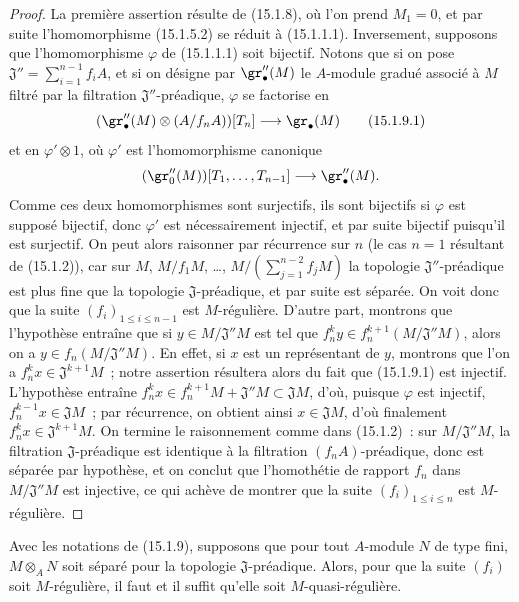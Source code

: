 \begin{proof}
La première assertion résulte de (15.1.8), où l'on prend $M_1=0$, et par suite
l'homomorphisme (15.1.5.2) se réduit à (15.1.1.1). Inversement, supposons que
l'homomorphisme $\varphi$ de (15.1.1.1) soit bijectif. Notons que si on pose
$\mathfrak{J}''=\sum_{i=1}^{n-1}f_iA$,
et si on désigne par $\gr''_\bullet(M)$ le $A$-module gradué associé à $M$
filtré par la filtration $\mathfrak{J}''$-préadique, $\varphi$ se factorise en
\[
  (\gr''_\bullet(M)\otimes(A/f_nA))[T_n]\longrightarrow\gr_\bullet(M)
  \tag{15.1.9.1}\label{0.15.1.9.1-fr}
\]
et en $\varphi'\otimes1$, où $\varphi'$ est l'homomorphisme canonique
\[
  (\gr''_0(M))[T_1,\ldots,T_{n-1}]
  \longrightarrow\gr''_\bullet(M).
\]
Comme ces deux homomorphismes sont surjectifs, ils sont bijectifs si
$\varphi$ est supposé bijectif, donc $\varphi'$ est nécessairement injectif,
et par suite bijectif puisqu'il est surjectif. On peut alors raisonner par
récurrence sur $n$ (le cas $n=1$ résultant de (15.1.2)), car sur
$M$, $M/f_1M$, \ldots, $M/(\sum_{j=1}^{n-2}f_jM)$
la topologie $\mathfrak{J}''$-préadique est plus fine que la topologie
$\mathfrak{J}$-préadique, et par suite est séparée. On voit donc que la suite
$(f_i)_{1\leq i\leq n-1}$ est $M$-régulière. D'autre part, montrons que
l'hypothèse entraîne que si $y\in M/\mathfrak{J}''M$ est tel que
$f_n^ky\in f_n^{k+1}(M/\mathfrak{J}''M)$,
alors on a $y\in f_n(M/\mathfrak{J}''M)$. En effet, si $x$ est un représentant
de $y$, montrons que l'on a $f_n^kx\in\mathfrak{J}^{k+1}M$~; notre assertion
résultera alors du fait que (15.1.9.1) est injectif. L'hypothèse entraîne
$f_n^kx\in f_n^{k+1}M+\mathfrak{J}''M\subset\mathfrak{J}M$,
d'où, puisque $\varphi$ est injectif,
$f_n^{k-1}x\in\mathfrak{J}M$~; par récurrence, on obtient ainsi
$x\in\mathfrak{J}M$, d'où finalement
$f_n^kx\in\mathfrak{J}^{k+1}M$. On termine le raisonnement comme dans
(15.1.2)~: sur $M/\mathfrak{J}''M$, la filtration
$\mathfrak{J}$-préadique est identique à la filtration
$(f_nA)$-préadique, donc est séparée par hypothèse, et on conclut que
l'homothétie de rapport $f_n$ dans $M/\mathfrak{J}''M$ est injective, ce qui
achève de montrer que la suite $(f_i)_{1\leq i\leq n}$ est $M$-régulière.
\end{proof}

\begin{corollary}[15.1.10]
\label{0.15.1.10-fr}
Avec les notations de \textup{(15.1.9)}, supposons que pour tout $A$-module $N$ de type
fini, $M\otimes_A N$ soit séparé pour la topologie
$\mathfrak{J}$-préadique. Alors, pour que la suite $(f_i)$ soit
$M$-régulière, il faut et il suffit qu'elle soit $M$-quasi-régulière.
\end{corollary}

